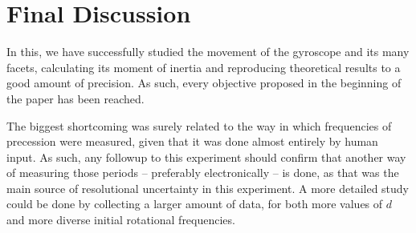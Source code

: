 \documentclass[a4paper,12pt]{article}
\begin{document}
\section{Final Discussion}

In this, we have successfully studied the movement of the gyroscope and its many facets, calculating its moment of inertia and reproducing theoretical results to a good amount of precision. As such, every objective proposed in the beginning of the paper has been reached.

The biggest shortcoming was surely related to the way in which frequencies of precession were measured, given that it was done almost entirely by human input. As such, any followup to this experiment should confirm that another way of measuring those periods -- preferably electronically -- is done, as that was the main source of resolutional uncertainty in this experiment. A more detailed study could be done by collecting a larger amount of data, for both more values of $d$ and more diverse initial rotational frequencies. 

\printbibliography
\end{document}
